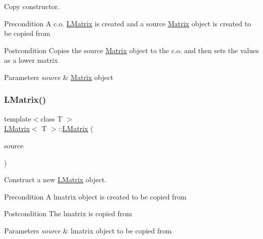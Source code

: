 Copy constructor. 

\begin{DoxyPrecond}{Precondition}
A c.\+o. \mbox{\hyperlink{class_l_matrix}{L\+Matrix}} is created and a source \mbox{\hyperlink{class_matrix}{Matrix}} object is created to be copied from 
\end{DoxyPrecond}
\begin{DoxyPostcond}{Postcondition}
Copies the source \mbox{\hyperlink{class_matrix}{Matrix}} object to the c.\+o. and then sets the values as a lower matrix 
\end{DoxyPostcond}

\begin{DoxyParams}{Parameters}
{\em source} & \mbox{\hyperlink{class_matrix}{Matrix}} object \\
\hline
\end{DoxyParams}
\mbox{\label{class_l_matrix_a0a4d56623c6c83d9fd2c3040e41429ae}} 
\subsubsection{\texorpdfstring{LMatrix()}{LMatrix()}\hspace{0.1cm}{\footnotesize\ttfamily [4/4]}}
{\footnotesize\ttfamily template$<$class T $>$ \\
\mbox{\hyperlink{class_l_matrix}{L\+Matrix}}$<$ T $>$\+::\mbox{\hyperlink{class_l_matrix}{L\+Matrix}} (\begin{DoxyParamCaption}\item[{const \mbox{\hyperlink{class_l_matrix}{L\+Matrix}}$<$ T $>$ \&}]{source }\end{DoxyParamCaption})}



Construct a new \mbox{\hyperlink{class_l_matrix}{L\+Matrix}} object. 

\begin{DoxyPrecond}{Precondition}
A lmatrix object is created to be copied from 
\end{DoxyPrecond}
\begin{DoxyPostcond}{Postcondition}
The lmatrix is copied from
\end{DoxyPostcond}

\begin{DoxyParams}{Parameters}
{\em source} & lmatrix object to be copied from \\
\hline
\end{DoxyParams}
\mbox{\label{class_l_matrix_ab4289f015b6b154b0f396550c1975250}} 
